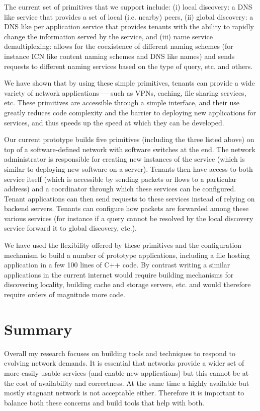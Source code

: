 \documentclass[letterpaper]{article}
\begin{document}
The current set of primitives that we support include: (i) local discovery: a DNS like service that provides a
set of local (i.e. nearby) peers, (ii) global discovery: a DNS like per application service that provides
tenants with the ability to rapidly change the information served by the service, and (iii) name service
demultiplexing: allows for the coexistence of different naming schemes (for instance ICN like content naming
schemes and DNS like names) and sends requests to different naming services based on the type of query, etc.
and others.

We have shown that by using these simple primitives, tenants can provide a wide variety of network applications --- such as
VPNs, caching, file sharing services, etc. These primitives are accessible through a simple interface, and their use
greatly reduces code complexity and the barrier to deploying new applications for services, and thus speeds up the speed
at which they can be developed.

Our current prototype builds five primitives (including the three listed above) on top of a software-defined network
with software switches at the end. The network administrator is responsible for creating new instances of the service
(which is similar to deploying new software on a server). Tenants then have access to both service itself (which is
accessible by sending packets or flows to a particular address) and a coordinator through which these services can be
configured. Tenant applications can then send requests to these services instead of relying on backend servers. Tenants
can configure how packets are forwarded among these various services (for instance if a query cannot be resolved by the
local discovery service forward it to global discovery, etc.). 

We have used the flexibility offered by these primitives and the configuration mechanism to build a number of prototype
applications, including a file hosting application in a few 100 lines of C++ code. By contrast writing a similar
applications in the current internet would require building mechanisms for discovering locality, building cache and
storage servers, etc. and would therefore require orders of magnitude more code.  

\section*{Summary}
Overall my research focuses on building tools and techniques to respond to evolving network demands. It is essential
that networks provide a wider set of more easily usable services (and enable new applications) but this cannot be at the
cost of availability and correctness. At the same time a highly available but mostly stagnant network is not acceptable
either. Therefore it is important to balance both these concerns and build tools that help with both.


\end{document}
